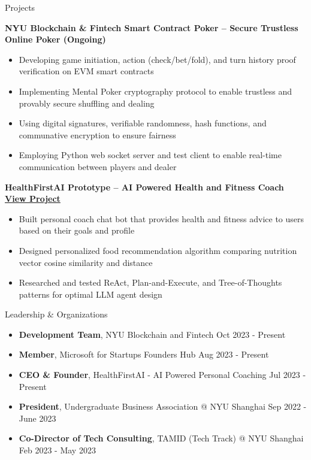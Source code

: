 \documentclass{resume} %
\begin{document}
\begin{rSection}{Projects}

	\textbf{NYU Blockchain \& Fintech Smart Contract Poker – Secure Trustless Online Poker (Ongoing)}
	\begin{itemize}
		\item Developing game initiation, action (check/bet/fold), and turn history proof verification on EVM smart contracts
		\item Implementing Mental Poker cryptography protocol to enable trustless and provably secure shuffling and dealing
		\item Using digital signatures, verifiable randomness, hash functions, and communative encryption to ensure fairness
		\item Employing Python web socket server and test client to enable real-time communication between players and dealer
	\end{itemize}

	\textbf{HealthFirstAI Prototype – AI Powered Health and Fitness Coach \href{https://github.com/healthfirstai/prototype-backend}{View Project}}
	\begin{itemize}
		\item Built personal coach chat bot that provides health and fitness advice to users based on their goals and profile
		\item Designed personalized food recommendation algorithm comparing nutrition vector cosine similarity and distance
		\item Researched and tested ReAct, Plan-and-Execute, and Tree-of-Thoughts patterns for optimal LLM agent design
	\end{itemize}

\end{rSection}


\begin{rSection}{Leadership \& Organizations}
	\begin{itemize}
		\item \textbf{Development Team}{, NYU Blockchain and Fintech} \hfill Oct 2023 - Present
		\item \textbf{Member}{, Microsoft for Startups Founders Hub} \hfill Aug 2023 - Present
		\item \textbf{CEO \& Founder}{, HealthFirstAI - AI Powered Personal Coaching} \hfill Jul 2023 - Present
		\item \textbf{President}{, Undergraduate Business Association @ NYU Shanghai} \hfill Sep 2022 - June 2023
		\item \textbf{Co-Director of Tech Consulting}{, TAMID (Tech Track) @ NYU Shanghai} \hfill Feb 2023 - May 2023
	\end{itemize}
\end{rSection}
\end{document}
